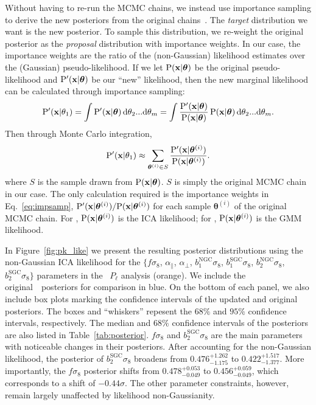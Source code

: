\documentclass[12pt, letterpaper, preprint]{aastex}
\newcommand{\beq}{\begin{equation}}
\newcommand{\eeq}{\end{equation}}
\newcommand{\Beut}{\citetalias{beutler2017}\xspace}
\newcommand{\Sinh}{\citetalias{sinha2017}\xspace}
\newcommand{\gmm}{{\small{GMM}}\xspace}
\newcommand{\ica}{{\small{ICA}}\xspace}
\begin{document}
Without having to re-run the MCMC chains, we instead use importance sampling
to derive the new posteriors
from the original chains~\citep[see][for details on importance sampling]{wasserman2004}. 
The \emph{target} distribution we want is the new posterior. To sample this 
distribution, we re-weight the original posterior as the \emph{proposal} 
distribution with importance weights. In our case, the importance weights are the ratio 
of the (non-Gaussian) likelihood estimates over the (Gaussian) pseudo-likelihood. If we let 
$\mathrm{P}({\bf x} | \bm{\theta})$ be the original pseudo-likelihood and 
$\mathrm{P}'({\bf x} | \bm{\theta})$ be our ``new'' likelihood, then the new 
marginal likelihood can be calculated through importance sampling:   
\beq
\mathrm{P}'({\bf x} | \theta_1) = \int \mathrm{P}'({\bf x} | \bm{\theta})\,\mathrm{d}\theta_2...\mathrm{d}\theta_m = \int \frac{\mathrm{P}'({\bf x} | \bm{\theta})}{\mathrm{P}({\bf x} | \bm{\theta})}\, \mathrm{P}({\bf x} | \bm{\theta})\,\mathrm{d}\theta_2...\mathrm{d}\theta_m. \\
\eeq
Then through Monte Carlo integration, 
\beq
\mathrm{P}'({\bf x} | \theta_1) \approx \sum\limits_{\bm{\theta}^{(i)} \in S} \frac{\mathrm{P}'({\bf x} | \bm{\theta}^{(i)})}{\mathrm{P}({\bf x} | \bm{\theta}^{(i)})}. \label{eq:impsamp}
\eeq
where $S$ is the sample drawn from $\mathrm{P}({\bf x} | \bm{\theta})$. $S$ 
is simply the original MCMC chain in our case. The only calculation required 
is the importance weights in Eq.~\ref{eq:impsamp}, 
${\mathrm{P}'({\bf x} | \bm{\theta}^{(i)})}/{\mathrm{P}({\bf x} | \bm{\theta}^{(i)})}$ for 
each sample $\bm{\theta}^{(i)}$ of the original MCMC chain. 
For \Beut, $\mathrm{P}({\bf x} | \bm{\theta}^{(i)})$ is the \ica likelihood;  
for \Sinh, $\mathrm{P}({\bf x} | \bm{\theta}^{(i)})$ is the \gmm
likelihood.


In Figure~\ref{fig:pk_like} we present the resulting posterior 
distributions using the non-Gaussian \ica likelihood for the 
$\big \{f \sigma_8$, $\alpha_\parallel$, $\alpha_\perp$, 
$b_1^\mathrm{NGC} \sigma_8$, $b_1^\mathrm{SGC} \sigma_8$, 
$b_2^\mathrm{NGC} \sigma_8$, $b_2^\mathrm{SGC} \sigma_8\big \}$
parameters in the \Beut~$P_\ell$ analysis (orange). We include 
the original~\Beut~posteriors for comparison in blue. On the 
bottom of each panel, we also include box plots marking the 
confidence intervals of the updated and original posteriors. 
The boxes and ``whiskers'' repesent the $68\%$ and $95\%$ 
confidence intervals, respectively. The median and $68\%$ 
confidence intervals of the posteriors are also listed in Table~\ref{tab:posterior}.
$f \sigma_8$ and $b_2^\mathrm{SGC} \sigma_8$ are the main parameters with 
noticeable changes in their posteriors. After accounting for the 
non-Gaussian likelihood, the posterior of $b_2^\mathrm{SGC} \sigma_8$
broadens from $0.476^{+1.262}_{-1.175}$ to $0.422^{+1.517}_{-1.377}$.
More importantly, the $f \sigma_8$ posterior
shifts from $0.478^{+0.053}_{-0.049}$ to $0.456^{+0.059}_{-0.049}$, which 
corresponds to a shift of $-0.44 \sigma$. The other parameter constraints, 
however, remain largely unaffected by likelihood non-Gaussianity. 
\end{document}
